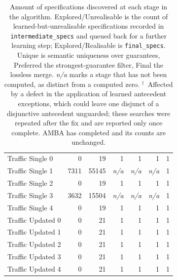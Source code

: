 \begin{table}[h]
\begin{tabular}{l|rr|rrr|c}
\midrule
Traffic Single 0 & 0 & 19 & 1 & 1 & 1 & 1 \\
Traffic Single 1 & 7311 & 55145 & \textit{n/a} & \textit{n/a} & \textit{n/a} & 1 \\
Traffic Single 2 & 0 & 19 & 1 & 1 & 1 & 1 \\
Traffic Single 3 & 3632 & 15504 & \textit{n/a} & \textit{n/a} & \textit{n/a} & 1 \\
Traffic Single 4 & 0 & 19 & 1 & 1 & 1 & 1 \\
\midrule
Traffic Updated 0 & 0 & 21 & 1 & 1 & 1 & 1 \\
Traffic Updated 1 & 0 & 21 & 1 & 1 & 1 & 1 \\
Traffic Updated 2 & 0 & 21 & 1 & 1 & 1 & 1 \\
Traffic Updated 3 & 0 & 21 & 1 & 1 & 1 & 1 \\
Traffic Updated 4 & 0 & 21 & 1 & 1 & 1 & 1 \\
\bottomrule
\end{tabular}
\caption{Amount of specifications discovered at each stage in the algorithm. Explored/Unrealisable is the count of learned-but-unrealisable specifications recorded in \texttt{intermediate\_specs} and queued back for a further learning step; Explored/Realisable is \texttt{final\_specs}. Unique is semantic uniqueness over guarantees, Preferred the strongest-guarantee filter, Final the lossless merge. \textit{n/a} marks a stage that has not been computed, as distinct from a computed zero. $^\dagger$~Affected by a defect in the application of learned antecedent exceptions, which could leave one disjunct of a disjunctive antecedent unguarded; these searches were repeated after the fix and are reported only once complete. AMBA has completed and its counts are unchanged.}
\label{tab:total}
\end{table}
